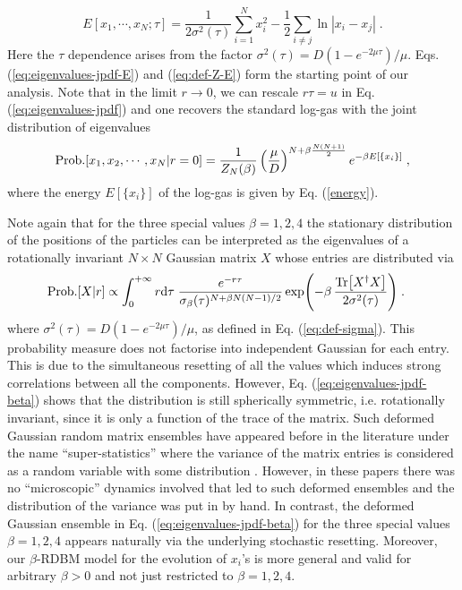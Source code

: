 \documentclass[onecolumn,superscriptaddress,
 amsmath,amssymb,
 aps,
 prd,
]{revtex4-1}
\newcommand{\bea}{\begin{eqnarray}}
\newcommand{\eea}{\end{eqnarray}}
\begin{document}
{
\begin{equation} \label{eq:def-Z-E}
E[x_1, \cdots, x_N; \tau] = \frac{1}{2 \sigma^2(\tau)} \sum_{i = 1}^N x_i^2 - \frac{1}{2} \sum_{i \neq j} \ln |x_i - x_j| \;.
\end{equation}
Here the $\tau$ dependence arises from the factor $\sigma^2(\tau) = D(1-e^{-2 \mu \tau})/\mu$. Eqs. (\ref{eq:eigenvalues-jpdf-E}) and (\ref{eq:def-Z-E}) form the starting point of our analysis. Note that in the limit $r \to 0$, we can rescale $r \tau = u$ in Eq. (\ref{eq:eigenvalues-jpdf}) and one recovers the standard log-gas with the joint distribution of eigenvalues 
\bea \label{GOE}
{\rm Prob.}[x_1, x_2, \cdots, x_N \vert r= 0] = \frac{1}{Z_N(\beta)} \left(\frac{\mu}{D}\right)^{N + \beta\frac{N(N+1)}{2}} e^{-\beta E[\{x_i\}]} \;,
\eea 
where the energy $E[\{x_i\}]$ of the log-gas is given by Eq. (\ref{energy}).

\vspace*{0.3cm}
Note again that for the three special values $\beta = 1,2, 4$ the stationary distribution of the positions of the particles can be interpreted as the eigenvalues of a rotationally invariant $N \times N$ Gaussian matrix $X$ whose entries are distributed via
\begin{align} 
{\rm Prob.}&[X   | r] \propto \int_0^{+\infty} r \dd \tau \; \frac{e^{- r \tau} }{\sigma_\beta(\tau)^{N + \beta N(N-1)/2}} \exp( - \beta\,\frac{\Tr[ X^\dagger X ]}{2 \sigma^2(\tau)}) \;.\label{eq:eigenvalues-jpdf-beta}
\end{align}
where $\sigma^2(\tau)  = D (1 - e^{-2 \mu \tau})/\mu$, as defined in Eq. (\ref{eq:def-sigma}). This probability measure does not factorise into independent Gaussian for each entry. This is due to the simultaneous resetting of all the values which induces strong correlations between all the components. However, Eq. (\ref{eq:eigenvalues-jpdf-beta}) shows that the distribution is still spherically symmetric, i.e. rotationally invariant, since it is only a function of the trace of the matrix. 
Such deformed Gaussian random matrix ensembles have appeared before in the literature under the name ``super-statistics'' where the variance of the matrix entries is considered as a random variable with some distribution \cite{AM05,BCP08,AAV09}. However, in these papers there was no ``microscopic'' dynamics involved that led to such deformed ensembles and the distribution of the variance was put in by hand. In contrast, the deformed Gaussian ensemble in Eq. (\ref{eq:eigenvalues-jpdf-beta}) for the three special values $\beta = 1,2,4$ appears naturally via the underlying stochastic resetting. Moreover, our $\beta$-RDBM model for the evolution of $x_i$'s is more general and valid for arbitrary $\beta >0$ and not just restricted to $\beta = 1,2,4$. 





}
\end{document}
